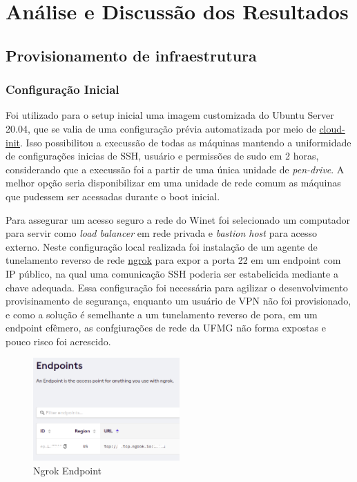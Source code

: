
\chapter{Análise e Discussão dos Resultados}

\section{Provisionamento de infraestrutura}
\label{sec:provisionamento}

\subsection{Configuração Inicial}

Foi utilizado para o setup inicial uma imagem customizada do Ubuntu Server 20.04, que se valia de uma configuração prévia automatizada por meio de \href{https://cloudinit.readthedocs.io/en/latest/}{cloud-init}. Isso possibilitou a execussão de todas as máquinas mantendo a uniformidade de configurações inicias de SSH, usuário e permissões de {sudo} em 2 horas, considerando que a execussão foi a partir de uma única unidade de \emph{pen-drive}. A melhor opção seria disponibilizar em uma unidade de rede comum as máquinas que pudessem ser acessadas durante o boot inicial.

Para assegurar um acesso seguro a rede do Winet foi selecionado um computador para servir como \emph{load balancer} em rede privada e \emph{bastion host} para acesso externo. Neste configuração local realizada foi instalação de um agente de tunelamento reverso de rede \href{https://ngrok.io}{ngrok} para expor a porta 22 em um endpoint com IP público, na qual uma comunicação SSH poderia ser estabelicida mediante a chave adequada. Essa configuração foi necessária para agilizar o desenvolvimento provisinamento de segurança, enquanto um usuário de VPN não foi provisionado, e como a solução é semelhante a um tunelamento reverso de pora, em um endpoint efêmero, as confgiurações de rede da UFMG não forma expostas e pouco risco foi acrescido. 


\begin{figure}[!ht]
    \centering
    \includegraphics[width=0.5\textwidth]{04-figuras/ngrok.png}
    \caption{Ngrok Endpoint}
    \label{fig:ngrok}
\end{figure}


